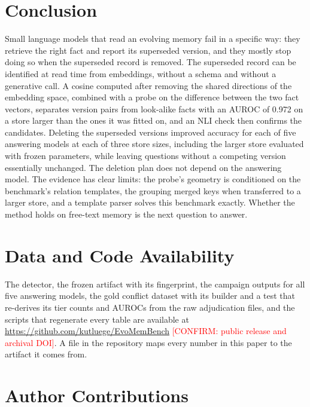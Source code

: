 \documentclass[11pt]{article}
\newcommand{\confirm}[1]{\textcolor{red}{[CONFIRM: #1]}} %
\begin{document}
\section{Conclusion}
\label{sec:conclusion}

Small language models that read an evolving memory fail in a specific way: they retrieve the right fact and report its superseded version, and they mostly stop doing so when the superseded record is removed. The superseded record can be identified at read time from embeddings, without a schema and without a generative call. A cosine computed after removing the shared directions of the embedding space, combined with a probe on the difference between the two fact vectors, separates version pairs from look-alike facts with an AUROC of 0.972 on a store larger than the ones it was fitted on, and an NLI check then confirms the candidates. Deleting the superseded versions improved accuracy for each of five answering models at each of three store sizes, including the larger store evaluated with frozen parameters, while leaving questions without a competing version essentially unchanged. The deletion plan does not depend on the answering model. The evidence has clear limits: the probe's geometry is conditioned on the benchmark's relation templates, the grouping merged keys when transferred to a larger store, and a template parser solves this benchmark exactly. Whether the method holds on free-text memory is the next question to answer.

\section*{Data and Code Availability}

The detector, the frozen artifact with its fingerprint, the campaign outputs for all five answering models, the gold conflict dataset with its builder and a test that re-derives its tier counts and AUROCs from the raw adjudication files, and the scripts that regenerate every table are available at \url{https://github.com/kutluege/EvoMemBench} \confirm{public release and archival DOI}. A file in the repository maps every number in this paper to the artifact it comes from.

\section*{Author Contributions}
\end{document}
